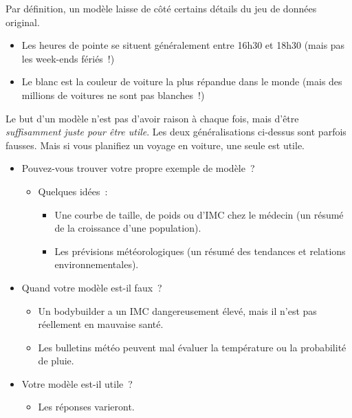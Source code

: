 \documentclass[12pt,a4paper]{article}
\begin{document}
\begin{center}
\end{center}

Par définition, un modèle laisse de côté certains détails du jeu de données original.

\begin{itemize}
  \item Les heures de pointe se situent généralement entre 16h30 et 18h30 (mais pas les week-ends fériés~!)
  \item Le blanc est la couleur de voiture la plus répandue dans le monde (mais des millions de voitures ne sont pas blanches~!)
\end{itemize}

\begin{keypointbox}
  Le but d'un modèle n'est pas d'avoir raison à chaque fois, mais d'être \emph{suffisamment juste pour être utile}. Les deux généralisations ci-dessus sont parfois fausses. Mais si vous planifiez un voyage en voiture, une seule est utile.
\end{keypointbox}

\begin{activitybox}
  \begin{itemize}
    \item Pouvez-vous trouver votre propre exemple de modèle~?
    \begin{itemize}
      \item Quelques idées~:
      \begin{itemize}
        \item Une courbe de taille, de poids ou d'IMC chez le médecin (un résumé de la croissance d'une population).
        \item Les prévisions météorologiques (un résumé des tendances et relations environnementales).
      \end{itemize}
    \end{itemize}
    \item Quand votre modèle est-il faux~?
    \begin{itemize}
      \item Un bodybuilder a un IMC dangereusement élevé, mais il n'est pas réellement en mauvaise santé.
      \item Les bulletins météo peuvent mal évaluer la température ou la probabilité de pluie.
    \end{itemize}
    \item Votre modèle est-il utile~?
    \begin{itemize}
      \item Les réponses varieront.
    \end{itemize}
  \end{itemize}
\end{activitybox}
\end{document}
